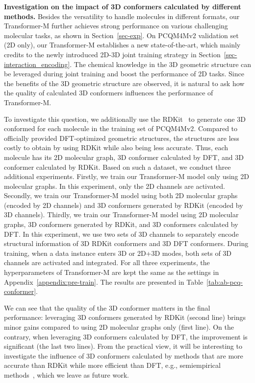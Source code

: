 \documentclass{article} \usepackage[dvipsnames]{xcolor}
\begin{document}
\textbf{Investigation on the impact of 3D conformers calculated by different methods.} 
Besides the versatility to handle molecules in different formats, our Transformer-M further achieves strong performance on various challenging molecular tasks, as shown in Section~\ref{sec-exp}. On PCQM4Mv2 validation set (2D only), our Transformer-M establishes a new state-of-the-art, which mainly credits to the newly introduced 2D-3D joint training strategy in Section~\ref{sec-interaction_encoding}. The chemical knowledge in the 3D geometric structure can be leveraged during joint training and boost the performance of 2D tasks. Since the benefits of the 3D geometric structure are observed, it is natural to ask how the quality of calculated 3D conformers influences the performance of Transformer-M. 

 To investigate this question, we additionally use the RDKit~\citep{Landrum2016RDKit2016_09_4} to generate one 3D conformed for each molecule in the training set of PCQM4Mv2. Compared to officially provided DFT-optimized geometric structures, the structures are less costly to obtain by using RDKit while also being less accurate. Thus, each molecule has its 2D molecular graph, 3D conformer calculated by DFT, and 3D conformer calculated by RDKit. Based on such a dataset, we conduct three additional experiments. Firstly, we train our Transformer-M model only using 2D molecular graphs. In this experiment, only the 2D channels are activated. Secondly, we train our Transformer-M model using both 2D molecular graphs (encoded by 2D channels) and 3D conformers generated by RDKit (encoded by 3D channels). Thirdly, we train our Transformer-M model using 2D molecular graphs, 3D conformers generated by RDKit, and 3D conformers calculated by DFT. In this experiment, we use two sets of 3D channels to separately encode structural information of 3D RDKit conformers and 3D DFT conformers. During training, when a data instance enters 3D or 2D+3D modes, both sets of 3D channels are activated and integrated. For all three experiments, the hyperparameters of Transformer-M are kept the same as the settings in Appendix~\ref{appendix:pre-train}. The results are presented in Table~\ref{tab:ab-pcq-conformer}.

 We can see that the quality of the 3D conformer matters in the final performance: leveraging 3D conformers generated by RDKit (second line) brings minor gains compared to using 2D molecular graphs only (first line). On the contrary, when leveraging 3D conformers calculated by DFT, the improvement is significant (the last two lines). From the practical view, it will be interesting to investigate the influence of 3D conformers calculated by methods that are more accurate than RDKit while more efficient than DFT, e.g., semiempirical methods~\citep{dral2016semiempirical}, which we leave as future work.
\end{document}
